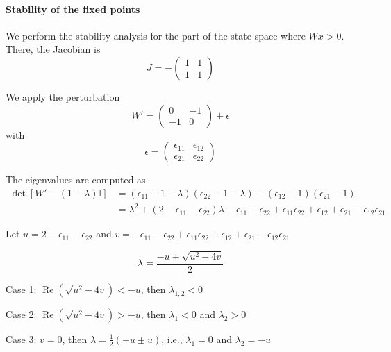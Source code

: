 \documentclass{article} %
\theoremstyle{definition}
\theoremstyle{remark}
\begin{document}
\paragraph{Stability of the fixed points}
We perform the stability analysis for the part of the state space where $Wx>0$.
There, the Jacobian is
\begin{equation}
J = -
\begin{pmatrix}
1  &  1 \\
1  &  1
\end{pmatrix}
\end{equation}

We apply the perturbation
\begin{equation}
W' = 
\begin{pmatrix}
0  &  -1 \\
-1  &  0
\end{pmatrix}
+ \epsilon
\end{equation}
with 
\begin{equation}
\epsilon = 
\begin{pmatrix}
\epsilon_{11}  &  \epsilon_{12} \\
\epsilon_{21}  &  \epsilon_{22}
\end{pmatrix}
\end{equation}

The eigenvalues are computed as
\begin{align*}
\det [W' -(1+\lambda)\mathbb{I}] &= (\epsilon_{11}-1-\lambda)(\epsilon_{22}-1-\lambda)-(\epsilon_{12}-1)(\epsilon_{21}-1)\\
&=\lambda^2 + (2-\epsilon_{11}-\epsilon_{22})\lambda -\epsilon_{11}-\epsilon_{22}+\epsilon_{11}\epsilon_{22} +\epsilon_{12} + \epsilon_{21} - \epsilon_{12}\epsilon_{21}
\end{align*}

Let 
$u=2-\epsilon_{11}-\epsilon_{22}$
and 
$v=-\epsilon_{11}-\epsilon_{22}+\epsilon_{11}\epsilon_{22} + \epsilon_{12} + \epsilon_{21} - \epsilon_{12}\epsilon_{21}$

\begin{equation}
\lambda = \frac{-u \pm \sqrt{u^2-4v}}{2}
\end{equation}



Case 1: $\operatorname{Re}(\sqrt{u^2-4v})<-u$, then 
$\lambda_{1,2}<0$


Case 2:  $\operatorname{Re}(\sqrt{u^2-4v})>-u$, then 
$\lambda_{1}<0$ and $\lambda_{2}>0$


Case 3: $v=0$, then 
$\lambda=\tfrac{1}{2}(-u\pm u)$, i.e.,
$\lambda_1=0$ and  $\lambda_2=-u$
\end{document}
